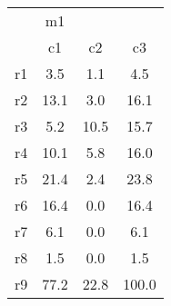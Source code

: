 \begin{tabular}{l*{3}{c}}
\hline\hline
            &          m1&            &            \\
            &          c1&          c2&          c3\\
\hline
r1          &         3.5&         1.1&         4.5\\
r2          &        13.1&         3.0&        16.1\\
r3          &         5.2&        10.5&        15.7\\
r4          &        10.1&         5.8&        16.0\\
r5          &        21.4&         2.4&        23.8\\
r6          &        16.4&         0.0&        16.4\\
r7          &         6.1&         0.0&         6.1\\
r8          &         1.5&         0.0&         1.5\\
r9          &        77.2&        22.8&       100.0\\
\hline\hline
\end{tabular}
